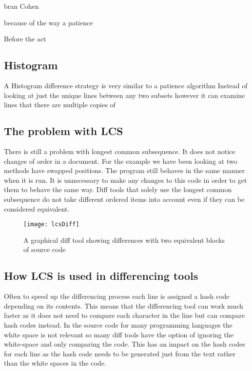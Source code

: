bran Cohen

because of the way a patience 

Before the act

\subsection{Histogram}
A Histogram difference strategy is very similar to a patience algorithm
Instead of looking at just the unique lines between any two subsets however it can examine lines that there are multiple copies of 

\subsection{The problem with LCS}
There is still a problem with longest common subsequence. It does not notice changes of order in a document.  For the example we have been looking at two methods have swapped positions.  The program still behaves in the same manner when it is run.  It is unnecessary to make any changes to this code in order to get them to behave the same way. Diff tools that solely use the longest common subsequence do not take different ordered items into account even if they can be considered equivalent.

\begin{figure}[h]
\begin{center}
\texttt{[image: lcsDiff]}
\end{center}
 \caption{A graphical diff tool showing differences with two equivalent blocks of source code}
\end{figure}

\subsection{How LCS is used in differencing tools}
Often to speed up the differencing process each line is assigned a hash code depending on its contents. 
This means that the differencing tool can work much faster as it does not need to compare each character in the line but can compare hash codes instead.
In the source code for many programming languages the white space is not relevant so many diff tools have the option of ignoring the white-space and only comparing the code.
This has an impact on the hash codes for each line as the hash code needs to be generated just from the text rather than the white spaces in the code.
% 
 


